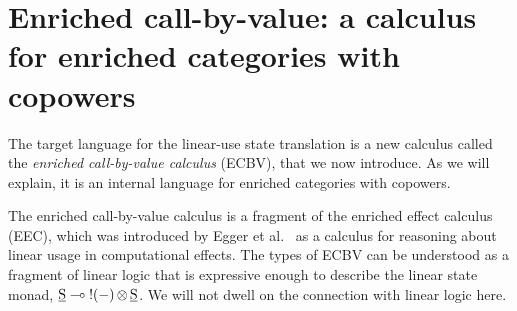 \documentclass{LMCS}
\newcommand{\pj}[3]{#1 \mathrel{\vdash^p} #2 \colon \! #3}
\newcommand{\EECstate}{\underline{\mathrm{S}}}
\newcommand{\codefont}[1]{\mathtt{#1}}
\newcommand{\tensor}{\otimes}
\newcommand{\ltensortype}[2]{{!} #1 \, {\tensor} \, #2}
\begin{document}
\newcommand{\geff}{e} 
\newcommand{\geffj}[3]{\pj{#1}{#2}{#3}}
\newcommand{\geffin}[2]{\codefont{in}_{#1}(#2)} \newcommand{\geffinname}[1]{\codefont{in}_{#1}} \newcommand{\geffabs}[2]{#1 \text{ to } \{#2 \}}

\newcommand{\cbvin}[2]{{\codefont{in}}_{#1}(#2)}
\newcommand{\cbvinl}[1]{\cbvin{1}{#1}}
\newcommand{\cbvinr}[1]{\cbvin{2}{#1}}
\newcommand{\cbvcase}[5]{\codefont{case}~#1~\codefont{of}~(\cbvinl{#2}.#3|\cbvinr{#4}.#5)}
\newcommand{\cbvcasen}[6]{\codefont{case}~#1~\codefont{of}~(\codefont{in_1}({#2}).#3|\dots|\codefont{in_{#4}}({#5}).#6)}
\newcommand{\cbvcasenp}[6]{\codefont{case}^p~#1~\codefont{of}~(\codefont{in_1}({#2}).#3|\dots|\codefont{in_{#4}}({#5}).#6)}

\newcommand{\arit}[2]{#1;  #2}
\newcommand{\arityj}[3]{#1: \arit{#2}{#3}}

\newcommand{\Homset}[3]{\mathrm{Hom}_{#1}({#2},{#3})}

\section{Enriched call-by-value: a calculus for enriched categories with copowers}
\label{sec:ecbv}
The target language for the linear-use state translation
is a new calculus called the 
\emph{enriched call-by-value calculus} (ECBV), that we now introduce.
As we will explain, it is an internal language for 
enriched categories with copowers.

The enriched call-by-value calculus 
is a fragment of the enriched effect calculus (EEC),
which was introduced by Egger et al.~\cite{Mogelberg:CSL:09,EEC:journal}
as a calculus for reasoning about linear usage in computational effects.
The types of ECBV
can be understood as a fragment of linear
logic that is expressive enough to describe the 
linear state monad, $\EECstate\lpop {\ltensortype {(-)}\EECstate}$.
We will not dwell on the connection with linear logic here.
\end{document}
